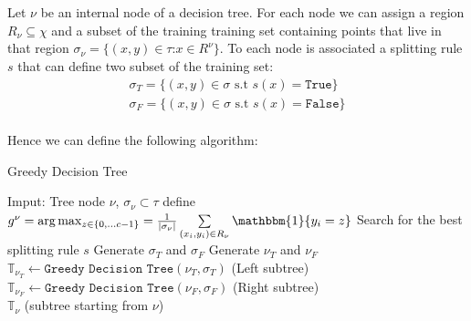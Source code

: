 \\
\\
Let \(\nu\) be an internal node of a decision tree. For each node we can assign a region \(R_\nu \subseteq \chi \) and a subset of the training training set containing points that live in that region \(\sigma_\nu = \{(x, y) \in \tau
\text{:}  x \in R^\nu\}\). To each node is associated a splitting rule \(s\) that can define two subset of the training set:
\begin{eqnarray*}
    \sigma_T = \{(x, y) \in \sigma \text{ s.t } s(x) = \texttt{True}\}\\
    \sigma_F = \{(x, y) \in \sigma \text{ s.t } s(x) = \texttt{False}\}
\end{eqnarray*}
\\
Hence we can define the following algorithm:
\begin{algorithm}[H]\caption{Greedy Decision Tree}
    \label{algo:greedy}
    \begin{algorithmic}
    \State Imput: Tree node \(\nu\), \(\sigma_\nu \subset \tau\)
    \State define \(g^\nu = \arg\max_{z \in \{0, \dots c- 1\}} = \frac{1}{| \sigma_\nu |}  \sum \limits_{(x_i, y_i) \in R_\nu}^{} \mathbbm{1}\{y_i = z\} \)
    \EndIf
    \State Search for the best splitting rule \(s\)
    \State Generate \(\sigma_T\) and \(\sigma_F\)
    \State Generate \(\nu_T\) and \(\nu_F\)
    \State \(\mathbb{T}_{\nu_T} \gets \texttt{Greedy Decision Tree}(\nu_T, \sigma_T)\) (Left subtree)
    \State \(\mathbb{T}_{\nu_F} \gets \texttt{Greedy Decision Tree}(\nu_F, \sigma_F)\) (Right subtree)\\
    \Return \(\mathbb{T}_\nu\) (subtree starting from \(\nu\))
    \end{algorithmic}            
\end{algorithm}

